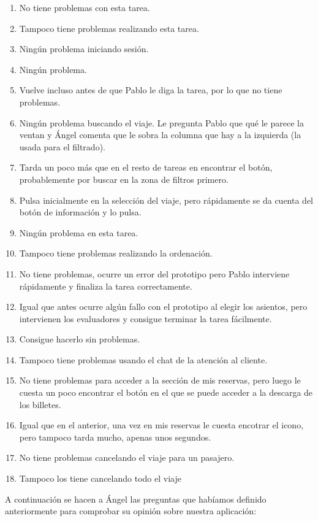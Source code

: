 \begin{enumerate}
    \item No tiene problemas con esta tarea.
    \item Tampoco tiene problemas realizando esta tarea.
    \item Ningún problema iniciando sesión.
    \item Ningún problema.
    \item Vuelve incluso antes de que Pablo le diga la tarea, por lo que no tiene problemas.
    \item Ningún problema buscando el viaje. Le pregunta Pablo que qué le parece la ventan y Ángel comenta que le sobra la columna
        que hay a la izquierda (la usada para el filtrado).
    \item Tarda un poco más que en el resto de tareas en encontrar el botón, probablemente por buscar en la zona de filtros primero.
    \item Pulsa inicialmente en la selección del viaje, pero rápidamente se da cuenta del botón de información y lo pulsa.
    \item Ningún problema en esta tarea.
    \item Tampoco tiene problemas realizando la ordenación.
    \item No tiene problemas, ocurre un error del prototipo pero Pablo interviene rápidamente y finaliza la tarea correctamente.
    \item Igual que antes ocurre algún fallo con el prototipo al elegir los asientos, pero intervienen los evaluadores y consigue terminar
        la tarea fácilmente.
    \item Consigue hacerlo sin problemas.
    \item Tampoco tiene problemas usando el chat de la atención al cliente.
    \item No tiene problemas para acceder a la sección de mis reservas, pero luego le cuesta un poco encontrar el botón en el que se puede acceder
        a la descarga de los billetes.
    \item Igual que en el anterior, una vez en mis reservas le cuesta encotrar el icono, pero tampoco tarda mucho, apenas unos segundos.
    \item No tiene problemas cancelando el viaje para un pasajero.
    \item Tampoco los tiene cancelando todo el viaje
\end{enumerate}

A continuación se hacen a Ángel las preguntas que habíamos definido anteriormente para comprobar su opinión sobre nuestra aplicación:

